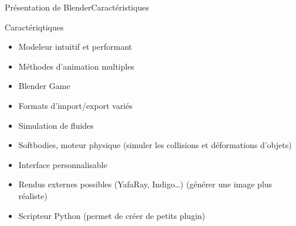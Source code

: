 \documentclass{beamer}
\begin{document}
\begin{frame}[c]{Présentation de Blender}{Caractéristiques}
    \begin{block}{Caractériqtiques}
        \begin{itemize}
            \item Modeleur intuitif et performant
            \item Méthodes d'animation multiples %
            \item Blender Game
            \item Formats d'import/export variés %
            \item Simulation de fluides %
            \item Softbodies, moteur physique 
            \newline(simuler les collisions et déformations d'objets)
            \item Interface personnalisable 
            \item Rendus externes possibles (YafaRay, Indigo…) \newline(générer une image plus réaliste)
            
            \item Scripteur Python (permet de créer de petits plugin)
        \end{itemize}
    \end{block}
\end{frame}
\end{document}

